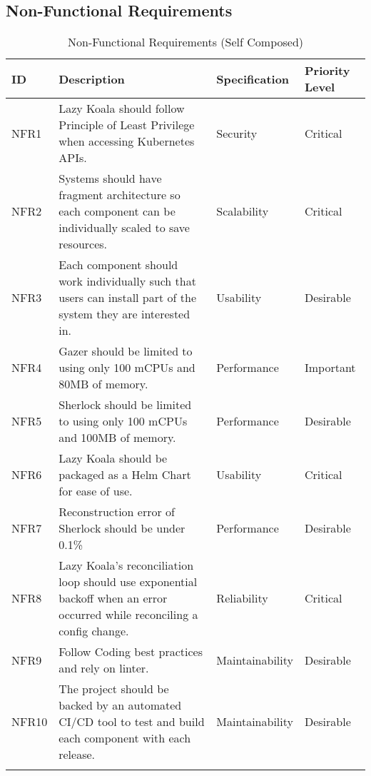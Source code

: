\subsection{Non-Functional Requirements}

\begin{longtable}{|p{13mm}|p{89mm}|p{26mm}|p{18mm}|}
\hline
    \textbf{ID} &
    \textbf{Description} &
    \textbf{Specification} &
    \textbf{Priority Level} \\ \hline
    
    NFR1 &
    Lazy Koala should follow Principle of Least Privilege when accessing Kubernetes APIs. &
    Security &
    Critical \\ \hline
    
    NFR2 &
    Systems should have fragment architecture so each component can be individually scaled to save resources. &
    Scalability &
    Critical \\ \hline
    
    NFR3 &
    Each component should work individually such that users can install part of the system they are interested in. &
    Usability &
    Desirable \\ \hline
    
    NFR4 &
    Gazer should be limited to using only 100 mCPUs and 80MB of memory. &
    Performance &
    Important \\ \hline
    
    NFR5 &
    Sherlock should be limited to using only 100 mCPUs and 100MB of memory. &
    Performance &
    Desirable \\ \hline
    
    NFR6 &
    Lazy Koala should be packaged as a Helm Chart for ease of use. &
    Usability &
    Critical \\ \hline
    
    NFR7 &
    Reconstruction error of Sherlock should be under 0.1\% &
    Performance &
    Desirable \\ \hline
    
    NFR8 &
    Lazy Koala’s reconciliation loop should use exponential backoff when an error occurred while reconciling a config change. &
    Reliability &
    Critical \\ \hline
    
    NFR9 &
    Follow Coding best practices and rely on linter. &
    Maintainability &
    Desirable \\ \hline
    
    NFR10 &
    The project should be backed by an automated CI/CD tool to test and build each component with each release. &
    Maintainability &
    Desirable \\ \hline

\caption{Non-Functional Requirements (Self Composed)}
\end{longtable}